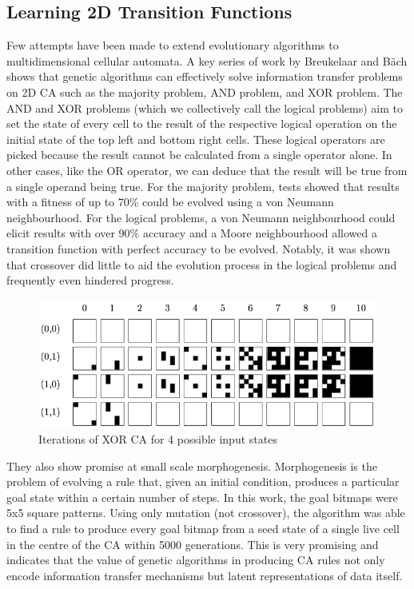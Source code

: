 \subsection{Learning 2D Transition Functions}

Few attempts have been made to extend evolutionary algorithms to multidimensional cellular automata. A key series of work by Breukelaar and B{\"a}ch\cite{breukelaar2004evolving} shows that genetic algorithms can effectively solve information transfer problems on 2D CA such as the majority problem, AND problem, and XOR problem. The AND and XOR problems (which we collectively call the logical problems) aim to set the state of every cell to the result of the respective logical operation on the initial state of the top left and bottom right cells. These logical operators are picked because the result cannot be calculated from a single operator alone. In other cases, like the OR operator, we can deduce that the result will be true from a single operand being true. For the majority problem, tests showed that results with a fitness of up to 70\% could be evolved using a von Neumann neighbourhood. For the logical problems, a von Neumann neighbourhood could elicit results with over 90\% accuracy and a Moore neighbourhood allowed a transition function with perfect accuracy to be evolved. Notably, it was shown that crossover did little to aid the evolution process in the logical problems and frequently even hindered progress.\\

\begin{figure}[!h]
\centering
\includegraphics[width=.8\textwidth]{images/XOR-ca.png}
\caption{Iterations of XOR CA for 4 possible input states}
\label{fig:nca}
\end{figure}

They also show promise at small scale morphogenesis. Morphogenesis is the problem of evolving a rule that, given an initial condition, produces a particular goal state within a certain number of steps. In this work, the goal bitmaps were 5x5 square patterns. Using only mutation (not crossover), the algorithm was able to find a rule to produce every goal bitmap from a seed state of a single live cell in the centre of the CA within 5000 generations. This is very promising and indicates that the value of genetic algorithms in producing CA rules not only encode information transfer mechanisms but latent representations of data itself.\\

